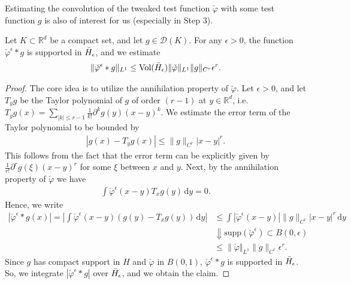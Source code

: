 Estimating the convolution of the tweaked test function \(\check \varphi\) with some test function \(g\) is also of interest for us (especially in Step 3). 

\begin{lemma}\label{step3:lemma}
    Let \(K \subset \mathbb{R}^d\) be a compact set, and let \(g \in \mathcal{D}(K)\). For any \(\epsilon > 0\), the function \(\check \varphi^\epsilon * g\) is supported in \(\bar{H}_{\epsilon}\), and we estimate     
    \begin{align*}
        \lVert \check \varphi^{\epsilon} * g \rVert_{L^1} \leq \mathrm{Vol}(\bar{H}_{\epsilon})  \lVert \check \varphi \rVert_{L^1} \lVert g \rVert_{C^r} \epsilon^r.
    \end{align*}
\end{lemma}

\begin{proof}
The core idea is to utilize the annihilation property of \(\check \varphi\). Let \(\epsilon > 0\), and let \(T_y g\) be the Taylor polynomial of \(g\) of order \((r-1)\) at \(y \in \mathbb{R}^d\), i.e. \(T_y g(x) = \sum\limits_{|k| \leq r - 1}\frac{1}{k!}\partial^k g(y)(x-y)^k\). We estimate the error term of the Taylor polynomial to be bounded by 
\begin{align*}
    |g(x) - T_y g(x)| \leq \lVert g \rVert_{C^r} |x-y|^r.
\end{align*}
This follows from the fact that the error term can be explicitly given by \(\frac{1}{r!}\partial^{r}g(\xi)(x - y)^r\) for some \(\xi\) between \(x\) and \(y\). Next, by the annihilation property of \(\check \varphi\) we have 
\begin{align*}
    \int\check \varphi^{\epsilon}(x - y)T_{x} g(y)  \, \mathrm{d}y = 0.
\end{align*}
Hence, we write 
\begin{align*}
        |\check \varphi^{\epsilon}* g(x)|  = \left|  \int\check \varphi^{\epsilon}(x - y) (g(y) - T_x g(y) )  \, \mathrm{d}y \right|
        &\leq \int |\check \varphi^{ \epsilon }(x-y)| \lVert g \rVert_{C^r} |x-y|^r \, \mathrm{d}y \\
        &\Downarrow \text{\(\mathrm{supp}(\check \varphi^{\epsilon}) \subset B(0,\epsilon)\)} \\
        &\leq \lVert \check \varphi \Vert_{L^1 } \lVert g \rVert_{C^r} \epsilon^r.
\end{align*}
Since \(g\) has compact support in \(H\) and \(\check \varphi\) in \(B(0,1)\), \(\check \varphi^{\epsilon}* g\) is supported in \(\bar{H}_{\epsilon}\). So, we integrate \(|\check \varphi^{\epsilon}* g|\) over \(\bar{H}_{\epsilon}\), and we obtain the claim.
\end{proof}

